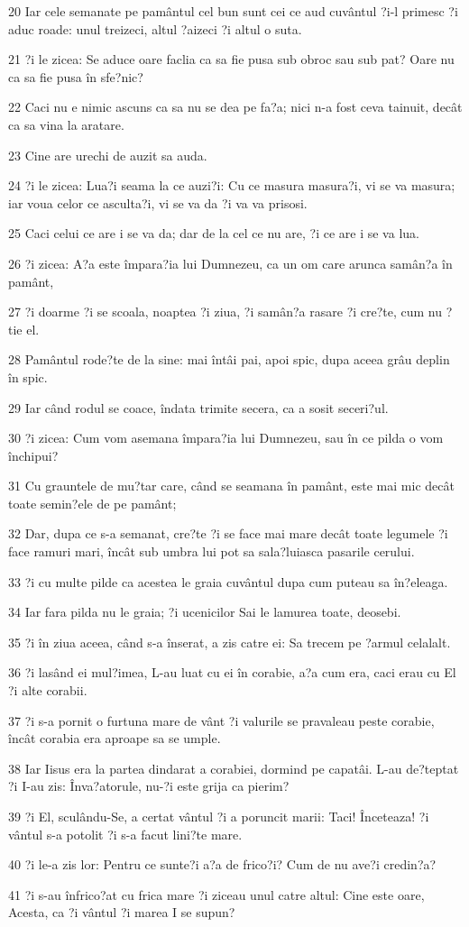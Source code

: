 \par 20 Iar cele semanate pe pamântul cel bun sunt cei ce aud cuvântul ?i-l primesc ?i aduc roade: unul treizeci, altul ?aizeci ?i altul o suta.
\par 21 ?i le zicea: Se aduce oare faclia ca sa fie pusa sub obroc sau sub pat? Oare nu ca sa fie pusa în sfe?nic?
\par 22 Caci nu e nimic ascuns ca sa nu se dea pe fa?a; nici n-a fost ceva tainuit, decât ca sa vina la aratare.
\par 23 Cine are urechi de auzit sa auda.
\par 24 ?i le zicea: Lua?i seama la ce auzi?i: Cu ce masura masura?i, vi se va masura; iar voua celor ce asculta?i, vi se va da ?i va va prisosi.
\par 25 Caci celui ce are i se va da; dar de la cel ce nu are, ?i ce are i se va lua.
\par 26 ?i zicea: A?a este împara?ia lui Dumnezeu, ca un om care arunca samân?a în pamânt,
\par 27 ?i doarme ?i se scoala, noaptea ?i ziua, ?i samân?a rasare ?i cre?te, cum nu ?tie el.
\par 28 Pamântul rode?te de la sine: mai întâi pai, apoi spic, dupa aceea grâu deplin în spic.
\par 29 Iar când rodul se coace, îndata trimite secera, ca a sosit seceri?ul.
\par 30 ?i zicea: Cum vom asemana împara?ia lui Dumnezeu, sau în ce pilda o vom închipui?
\par 31 Cu grauntele de mu?tar care, când se seamana în pamânt, este mai mic decât toate semin?ele de pe pamânt;
\par 32 Dar, dupa ce s-a semanat, cre?te ?i se face mai mare decât toate legumele ?i face ramuri mari, încât sub umbra lui pot sa sala?luiasca pasarile cerului.
\par 33 ?i cu multe pilde ca acestea le graia cuvântul dupa cum puteau sa în?eleaga.
\par 34 Iar fara pilda nu le graia; ?i ucenicilor Sai le lamurea toate, deosebi.
\par 35 ?i în ziua aceea, când s-a înserat, a zis catre ei: Sa trecem pe ?armul celalalt.
\par 36 ?i lasând ei mul?imea, L-au luat cu ei în corabie, a?a cum era, caci erau cu El ?i alte corabii.
\par 37 ?i s-a pornit o furtuna mare de vânt ?i valurile se pravaleau peste corabie, încât corabia era aproape sa se umple.
\par 38 Iar Iisus era la partea dindarat a corabiei, dormind pe capatâi. L-au de?teptat ?i I-au zis: Înva?atorule, nu-?i este grija ca pierim?
\par 39 ?i El, sculându-Se, a certat vântul ?i a poruncit marii: Taci! Înceteaza! ?i vântul s-a potolit ?i s-a facut lini?te mare.
\par 40 ?i le-a zis lor: Pentru ce sunte?i a?a de frico?i? Cum de nu ave?i credin?a?
\par 41 ?i s-au înfrico?at cu frica mare ?i ziceau unul catre altul: Cine este oare, Acesta, ca ?i vântul ?i marea I se supun?


